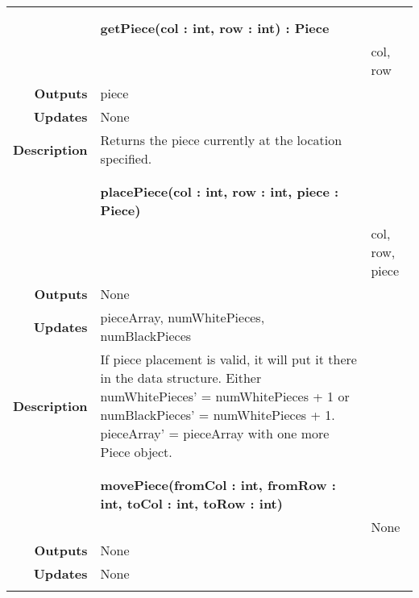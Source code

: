 \documentclass[10pt]{article}
\begin{document}
\begin{tabularx}{\linewidth}{ >{\bfseries}r Xp{2cm} }
\begin{tabular}[t]{@{} p{2.5cm} p{10cm}}
                                     & \\
                                     \end{tabular} \\
                            & \bf{getPiece(col : int, row : int)} : Piece \\
                            & \begin{tabular}[t]{@{} p{2.5cm} p{10cm}} 
                                    Inputs & col, row \\
                                    Outputs & piece \\
                                    Updates & None \\ 
			    Description & Returns the piece currently at the location specified. \\
                                     & \\
                                     \end{tabular} \\
                            & \bf{placePiece(col : int, row : int, piece : Piece)} \\
                            & \begin{tabular}[t]{@{} p{2.5cm} p{10cm}}
                                    Inputs &  col, row, piece \\
                                    Outputs & None \\
                                    Updates & pieceArray, numWhitePieces, numBlackPieces \\ 
                                    Description & If piece placement is valid, it will put it there in the data structure. Either numWhitePieces' = numWhitePieces + 1 or numBlackPieces' = numWhitePieces + 1. pieceArray' = pieceArray with one more Piece object.\\
                                     & \\
                                     \end{tabular} \\
                            & \bf{movePiece(fromCol : int, fromRow : int, toCol : int, toRow : int)} \\
                            & \begin{tabular}[t]{@{} p{2.5cm} p{10cm}}
                                    Inputs  & None \\
                                    Outputs & None \\
                                    Updates & None \\

\end{tabular}
\end{tabularx}
\end{document}
